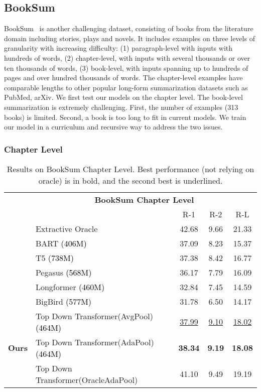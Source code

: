 \documentclass{article} \usepackage{iclr2022_conference,times}
\newcommand{\todof}{{Top Down Transformer}\xspace} \newcommand{\todofull}{{Top Down Transformer}\xspace} \newcommand\todo[1]{\textcolor{red}{(#1)}}
\begin{document}
\subsection{BookSum}
BookSum~\citep{kryscinski2021booksum} is another challenging dataset, consisting of books from the literature domain including stories, plays and novels. It includes examples on three levels of granularity with increasing difficulty: (1) paragraph-level with inputs with hundreds of words, (2) chapter-level, with inputs with several thousands or over ten thousands of words, (3) book-level, with inputs spanning up to hundreds of pages and over hundred thousands of words. The chapter-level examples have comparable lengths to other popular long-form summarization datasets such as PubMed, arXiv. We first test our models on the chapter level. The book-level summarization is extremely challenging. First, the number of examples (313 books) is limited. Second, a book is too long to fit in current models. We train our model in a curriculum and recursive way to address the two issues. 


\subsubsection{Chapter Level}

\begin{table}[h!]
\small
\centering
\begin{tabular}{c l c c c} 
\toprule
& \multicolumn{4}{c}{\textbf{BookSum Chapter Level}}\\
& & R-1 & R-2 & R-L \\
\hline
&Extractive Oracle  & 42.68 & 9.66 & 21.33 \\ \cline{2-5} 
&BART \textcolor{black}{(406M)}  & 37.09 & 8.23 & 15.37 \\ 
&T5 \textcolor{black}{(738M)} & 37.38 & 8.42 & 16.77 \\ 
&Pegasus \textcolor{black}{(568M)} & 36.17 & 7.79 & 16.09 \\ \cline{2-5}
&Longformer  \textcolor{black}{(460M)} & 32.84 & 7.45 & 14.59 \\ 
&BigBird \textcolor{black}{(577M)} & 31.78 & 6.50 & 14.17 \\ 
\hline
\multirow{3}{*}{\bf Ours} & \todof (AvgPool) \textcolor{black}{(464M)} & \underline{37.99} & \underline{9.10} & \underline{18.02} \\ 
    & \todof (AdaPool) \textcolor{black}{(464M)} & \textbf{38.34} & \textbf{9.19} & \textbf{18.08} \\ \cline{2-5}
    & \todof (OracleAdaPool) & 41.10 & 9.49 & 19.19 \\ 
\hline
\end{tabular}
\caption{\scriptsize Results on BookSum Chapter Level. Best performance (not relying on oracle) is in bold, and the second best is underlined.}
\label{table:booksum-chapter}
\end{table}
\end{document}
